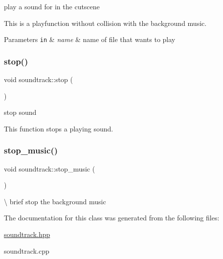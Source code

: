 play a sound for in the cutscene 

This is a playfunction without collision with the background music.


\begin{DoxyParams}[1]{Parameters}
\mbox{\tt in}  & {\em name} & name of file that wants to play \\
\hline
\end{DoxyParams}
\mbox{\label{classsoundtrack_a9047bea4f37493cbe81a990bc9d0c4e7}} 
\subsubsection{\texorpdfstring{stop()}{stop()}}
{\footnotesize\ttfamily void soundtrack\+::stop (\begin{DoxyParamCaption}{ }\end{DoxyParamCaption})}



stop sound 

This function stops a playing sound. \mbox{\label{classsoundtrack_a9f25fee4c6d5dbc820e2a18b13b43e68}} 
\subsubsection{\texorpdfstring{stop\+\_\+music()}{stop\_music()}}
{\footnotesize\ttfamily void soundtrack\+::stop\+\_\+music (\begin{DoxyParamCaption}{ }\end{DoxyParamCaption})}

\textbackslash{} brief stop the background music 

The documentation for this class was generated from the following files\+:\begin{DoxyCompactItemize}
\item 
\hyperlink{soundtrack_8hpp}{soundtrack.\+hpp}\item 
soundtrack.\+cpp\end{DoxyCompactItemize}

